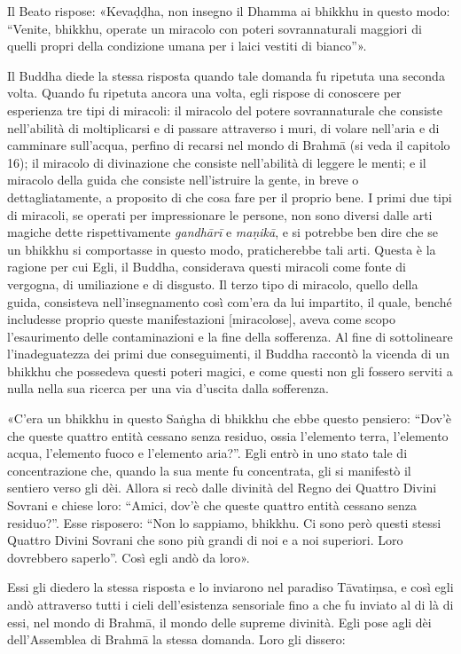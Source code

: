 Il Beato rispose: «Kevaḍḍha, non insegno il Dhamma ai bhikkhu in questo modo:
“Venite, bhikkhu, operate un miracolo con poteri sovrannaturali maggiori di
quelli propri della condizione umana per i laici vestiti di bianco”».

 Il Buddha diede la stessa risposta quando tale
domanda fu ripetuta una seconda volta. Quando fu ripetuta ancora una volta, egli
rispose di conoscere per esperienza tre tipi di miracoli: il miracolo del potere
sovrannaturale che consiste nell’abilità di moltiplicarsi e di passare
attraverso i muri, di volare nell’aria e di camminare sull’acqua, perfino di
recarsi nel mondo di Brahmā (si veda il capitolo 16); il miracolo di divinazione
che consiste nell’abilità di leggere le menti; e il miracolo della guida che
consiste nell’istruire la gente, in breve o dettagliatamente, a proposito di che
cosa fare per il proprio bene. I primi due tipi di miracoli, se operati per
impressionare le persone, non sono diversi dalle arti magiche dette
rispettivamente \emph{gandhārī} e \emph{maṇikā}, e si potrebbe ben dire che se
un bhikkhu si comportasse in questo modo, praticherebbe tali arti. Questa è la
ragione per cui Egli, il Buddha, considerava questi miracoli come fonte di
vergogna, di umiliazione e di disgusto. Il terzo tipo di miracolo, quello della
guida, consisteva nell’insegnamento così com’era da lui impartito, il quale,
benché includesse proprio queste manifestazioni [miracolose], aveva come scopo
l’esaurimento delle contaminazioni e la fine della sofferenza. Al fine di
sottolineare l’inadeguatezza dei primi due conseguimenti, il Buddha raccontò la
vicenda di un bhikkhu che possedeva questi poteri magici, e come questi non gli
fossero serviti a nulla nella sua ricerca per una via d’uscita dalla sofferenza.

 «C’era un bhikkhu in questo Saṅgha di bhikkhu che ebbe
questo pensiero: “Dov’è che queste quattro entità cessano senza residuo, ossia
l’elemento terra, l’elemento acqua, l’elemento fuoco e l’elemento aria?”. Egli
entrò in uno stato tale di concentrazione che, quando la sua mente fu
concentrata, gli si manifestò il sentiero verso gli dèi. Allora si recò dalle
divinità del Regno dei Quattro Divini Sovrani e chiese loro: “Amici, dov’è che
queste quattro entità cessano senza residuo?”. Esse risposero: “Non lo sappiamo,
bhikkhu. Ci sono però questi stessi Quattro Divini Sovrani che sono più grandi
di noi e a noi superiori. Loro dovrebbero saperlo”. Così egli andò da loro».

 Essi gli diedero la stessa risposta e lo inviarono
nel paradiso Tāvatiṃsa, e così egli andò attraverso tutti i cieli dell’esistenza
sensoriale fino a che fu inviato al di là di essi, nel mondo di Brahmā, il mondo
delle supreme divinità. Egli pose agli dèi dell’Assemblea di Brahmā la stessa
domanda. Loro gli dissero:

